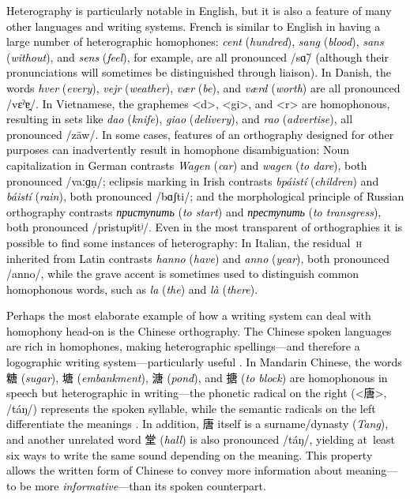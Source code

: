 \documentclass[doc,biblatex]{apa7}
\newcommand\newmaterial[1]{\textcolor{black}{#1}}
\begin{document}
\newmaterial{Heterography is particularly notable in English, but it is also a feature of many other languages and writing systems. French is similar to English in having a large number of heterographic homophones: \textit{cent} (\textit{hundred}), \textit{sang} (\textit{blood}), \textit{sans} (\textit{without}), and \textit{sens} (\textit{feel}), for example, are all pronounced /sɑ̃/ (although their pronunciations will sometimes be distinguished through liaison). In Danish, the words \textit{hver} (\textit{every}), \textit{vejr} (\textit{weather}), \textit{vær} (\textit{be}), and \textit{værd} (\textit{worth}) are all pronounced /vεˀɐ̯/. In Vietnamese, the graphemes <d>, <gi>, and <r> are homophonous, resulting in sets like \textit{dao} (\textit{knife}), \textit{giao} (\textit{delivery}), and \textit{rao} (\textit{advertise}), all pronounced /zāw/. In some cases, features of an orthography designed for other purposes can inadvertently result in homophone disambiguation: Noun capitalization in German contrasts \textit{Wagen} (\textit{car}) and \textit{wagen} (\textit{to dare}), both pronounced /vaːɡṇ/; eclipsis marking in Irish contrasts \textit{bpáistí} (\textit{children}) and \textit{báistí} (\textit{rain}), both pronounced /bɑʃti/; and the morphological principle of Russian orthography contrasts \textit{приступить} (\textit{to start}) and \textit{преступить} (\textit{to transgress}), both pronounced /pristupʲitʲ/. Even in the most transparent of orthographies it is possible to find some instances of heterography: In Italian, the residual~\textsc{h} inherited from Latin contrasts \textit{hanno} (\textit{have}) and \textit{anno} (\textit{year}), both pronounced /anno/, while the grave accent is sometimes used to distinguish common homophonous words, such as \textit{la} (\textit{the}) and \textit{là} (\textit{there}).}

\newmaterial{Perhaps the most elaborate example of how a writing system can deal with homophony head-on is the Chinese orthography. The Chinese spoken languages are rich in homophones, making heterographic spellings---and therefore a logographic writing system---particularly useful \parencite{Frost:2012}. In Mandarin Chinese, the words 糖 (\textit{sugar}), 塘 (\textit{embankment}), 溏 (\textit{pond}), and 搪 (\textit{to block}) are homophonous in speech but heterographic in writing---the phonetic radical on the right (<唐>, /táŋ/) represents the spoken syllable, while the semantic radicals on the left differentiate the meanings \parencite[p.~101]{Coulmas:1991}. In addition, 唐 itself is a surname/dynasty (\textit{Tang}), and another unrelated word 堂 (\textit{hall}) is also pronounced /táŋ/, yielding at~least six ways to write the same sound depending on the meaning. This property allows the written form of Chinese to convey more information about meaning---to be more \textit{informative}---than its spoken counterpart.}
\end{document}
